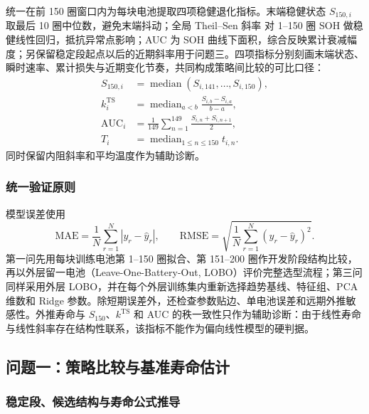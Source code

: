 \documentclass[withoutpreface]{cumcmthesis}
\newcommand{\RMSE}{\mathrm{RMSE}}
\newcommand{\MAE}{\mathrm{MAE}}
\newcommand{\TS}{\mathrm{TS}}
\begin{document}
统一在前 150 圈窗口内为每块电池提取四项稳健退化指标。末端稳健状态 $S_{150,i}$ 取最后 10 圈中位数，避免末端抖动；全局 Theil--Sen 斜率\cite{sen1968} 对 1--150 圈 SOH 做稳健线性回归，抵抗异常点影响；AUC 为 SOH 曲线下面积，综合反映累计衰减幅度；另保留稳定段起点以后的近期斜率用于问题三。四项指标分别刻画末端状态、瞬时速率、累计损失与近期变化节奏，共同构成策略间比较的可比口径：
\begin{align}
S_{150,i}&=\operatorname{median}(S_{i,141},\ldots,S_{i,150}),\label{eq:s150}\\
k_i^{\TS}&=\operatorname{median}_{a<b}\frac{S_{i,b}-S_{i,a}}{b-a},\\
\mathrm{AUC}_i&=\frac{1}{149}\sum_{n=1}^{149}\frac{S_{i,n}+S_{i,n+1}}{2},\\
T_i&=\operatorname{median}_{1\le n\le150}t_{i,n}.
\end{align}
同时保留内阻斜率和平均温度作为辅助诊断。

\subsubsection{统一验证原则}

模型误差使用
\begin{equation}
\MAE=\frac1N\sum_{r=1}^N|y_r-\hat y_r|,
\qquad
\RMSE=\sqrt{\frac1N\sum_{r=1}^N(y_r-\hat y_r)^2}.
\end{equation}
第一问先用每块训练电池第 1--150 圈拟合、第 151--200 圈作开发阶段结构比较，再以外层留一电池（Leave-One-Battery-Out, LOBO）评价完整选型流程；第三问同样采用外层 LOBO，并在每个外层训练集内重新选择趋势基线、特征组、PCA 维数和 Ridge 参数。除短期误差外，还检查参数贴边、单电池误差和远期外推敏感性。外推寿命与 $S_{150}$、$k^{\TS}$ 和 AUC 的秩一致性只作为辅助诊断：由于线性寿命与线性斜率存在结构性联系，该指标不能作为偏向线性模型的硬判据。

\subsection{问题一：策略比较与基准寿命估计}

\subsubsection{稳定段、候选结构与寿命公式推导}
\end{document}
